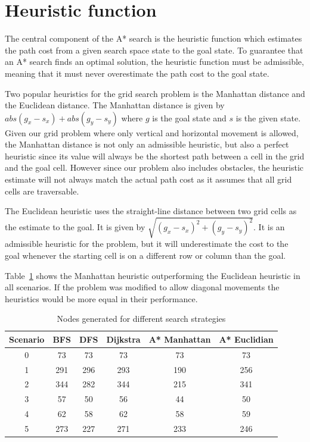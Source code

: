 \section*{Heuristic function}

The central component of the A* search is the heuristic function which estimates the path cost from a given search space state to the goal state. To guarantee that an A* search finds an optimal solution, the heuristic function must be admissible, meaning that it must never overestimate the path cost to the goal state.

Two popular heuristics for the grid search problem is the Manhattan distance and the Euclidean distance. The Manhattan distance is given by $\textit{abs}(g_x - s_x) + \textit{abs}(g_y - s_y)$ where $g$ is the goal state and $s$ is the given state. Given our grid problem where only vertical and horizontal movement is allowed, the Manhattan distance is not only an admissible heuristic, but also a perfect heuristic since its value will always be the shortest path between a cell in the grid and the goal cell. However since our problem also includes obstacles, the heuristic estimate will not always match the actual path cost as it assumes that all grid cells are traversable.

The Euclidean heuristic uses the straight-line distance between two grid cells as the estimate to the goal. It is given by $\sqrt{(g_x - s_x)^2 + (g_y - s_y)^2}$. It is an admissible heuristic for the problem, but it will underestimate the cost to the goal whenever the starting cell is on a different row or column than the goal.

Table~\ref{table:vi_generated_nodes} shows the Manhattan heuristic outperforming the Euclidean heuristic in all scenarios. If the problem was modified to allow diagonal movements the heuristics would be more equal in their performance.

\begin{table}
\centering
\begin{tabular}{c|ccccc}
Scenario & BFS & DFS & Dijkstra & A* Manhattan & A* Euclidian \\
\hline
0        &  73 &  73 &       73 &           73 &           73 \\
1        & 291 & 296 &      293 &          190 &          256 \\
2        & 344 & 282 &      344 &          215 &          341 \\
3        &  57 &  50 &       56 &           44 &           50 \\
4        &  62 &  58 &       62 &           58 &           59 \\
5        & 273 & 227 &      271 &          233 &          246 \\
\end{tabular}
\caption{Nodes generated for different search strategies}
\label{table:vi_generated_nodes}
\end{table}

